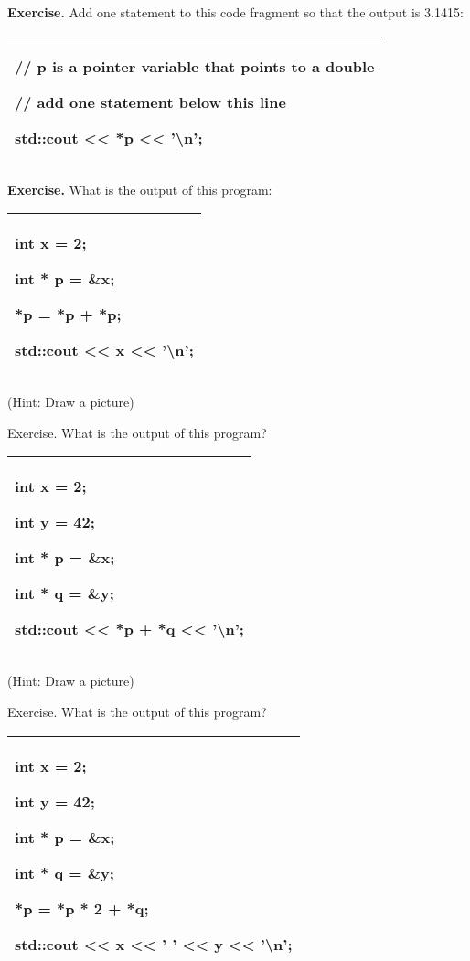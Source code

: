 \documentclass[
]{article}
\begin{document}
\textbf{Exercise.} Add one statement to this code fragment so that the
output is 3.1415:

\begin{longtable}[]{@{}l@{}}
\toprule
\endhead
\begin{minipage}[t]{0.97\columnwidth}\raggedright
// p is a pointer variable that points to a double

// add one statement below this line

std::cout \textless\textless{} *p \textless\textless{}
'\textbackslash n';\strut
\end{minipage}\tabularnewline
\bottomrule
\end{longtable}

\textbf{Exercise.} What is the output of this program:

\begin{longtable}[]{@{}l@{}}
\toprule
\endhead
\begin{minipage}[t]{0.97\columnwidth}\raggedright
int x = 2;

int * p = \&x;

*p = *p + *p;

std::cout \textless\textless{} x \textless\textless{}
'\textbackslash n';\strut
\end{minipage}\tabularnewline
\bottomrule
\end{longtable}

(Hint: Draw a picture)

Exercise. What is the output of this program?

\begin{longtable}[]{@{}l@{}}
\toprule
\endhead
\begin{minipage}[t]{0.97\columnwidth}\raggedright
int x = 2;

int y = 42;

int * p = \&x;

int * q = \&y;

std::cout \textless\textless{} *p + *q \textless\textless{}
'\textbackslash n';\strut
\end{minipage}\tabularnewline
\bottomrule
\end{longtable}

(Hint: Draw a picture)

Exercise. What is the output of this program?

\begin{longtable}[]{@{}l@{}}
\toprule
\endhead
\begin{minipage}[t]{0.97\columnwidth}\raggedright
int x = 2;

int y = 42;

int * p = \&x;

int * q = \&y;

*p = *p * 2 + *q;

std::cout \textless\textless{} x \textless\textless{} ' '
\textless\textless{} y \textless\textless{} '\textbackslash n';\strut
\end{minipage}\tabularnewline
\bottomrule
\end{longtable}
\end{document}
